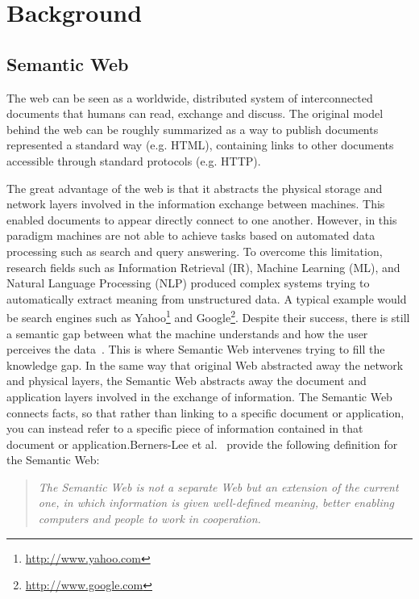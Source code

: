 \chapter{Background} \label{ch:background}
\graphicspath{{Background/figures/}}

\section{Semantic Web} \label{sec:sematic-web}

The web can be seen as a worldwide, distributed system of interconnected documents that humans can read, exchange and discuss. The original model behind the web can be roughly summarized as a way to publish documents represented a standard way (e.g. HTML), containing links to other documents accessible through standard protocols (e.g. HTTP).

The great advantage of the web is that it abstracts the physical storage and network layers involved in the information exchange between machines. This enabled documents to appear directly connect to one another. However, in this paradigm machines are not able to achieve tasks based on automated data processing such as search and query answering. To overcome this limitation, research fields such as Information Retrieval (IR), Machine Learning (ML), and Natural Language Processing (NLP) produced complex systems trying to automatically extract meaning from unstructured data. A typical example would be search engines such as Yahoo\footnote{\url{http://www.yahoo.com}} and Google\footnote{\url{http://www.google.com}}. Despite their success, there is still a semantic gap between what the machine understands and how the user perceives the data~\cite{Mika:book:07}. This is where Semantic Web intervenes trying to fill the knowledge gap. In the same way that original Web abstracted away the network and physical layers, the Semantic Web abstracts away the document and application layers involved in the exchange of information. The Semantic Web connects facts, so that rather than linking to a specific document or application, you can instead refer to a specific piece of information contained in that document or application.Berners-Lee et al.~\cite{BernersLee:ScientificAmerican:01} provide the following definition for the Semantic Web:

\begin{quote}
\emph{The Semantic Web is not a separate Web but an extension of the current one, in which information is given well-defined meaning, better enabling computers and people to work in cooperation.}
\end{quote}

